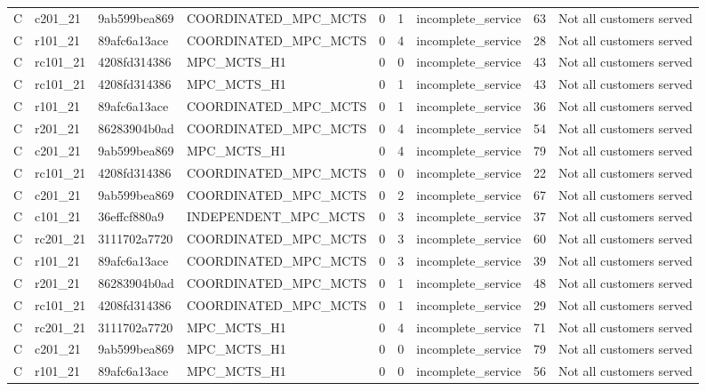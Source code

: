 \begin{table}
{\begin{tabular}{llllrrlrl}
C & c201\_21 & 9ab599bea869 & COORDINATED\_MPC\_MCTS & 0 & 1 & incomplete\_service & 63 & Not all customers served \\
C & r101\_21 & 89afc6a13ace & COORDINATED\_MPC\_MCTS & 0 & 4 & incomplete\_service & 28 & Not all customers served \\
C & rc101\_21 & 4208fd314386 & MPC\_MCTS\_H1 & 0 & 0 & incomplete\_service & 43 & Not all customers served \\
C & rc101\_21 & 4208fd314386 & MPC\_MCTS\_H1 & 0 & 1 & incomplete\_service & 43 & Not all customers served \\
C & r101\_21 & 89afc6a13ace & COORDINATED\_MPC\_MCTS & 0 & 1 & incomplete\_service & 36 & Not all customers served \\
C & r201\_21 & 86283904b0ad & COORDINATED\_MPC\_MCTS & 0 & 4 & incomplete\_service & 54 & Not all customers served \\
C & c201\_21 & 9ab599bea869 & MPC\_MCTS\_H1 & 0 & 4 & incomplete\_service & 79 & Not all customers served \\
C & rc101\_21 & 4208fd314386 & COORDINATED\_MPC\_MCTS & 0 & 0 & incomplete\_service & 22 & Not all customers served \\
C & c201\_21 & 9ab599bea869 & COORDINATED\_MPC\_MCTS & 0 & 2 & incomplete\_service & 67 & Not all customers served \\
C & c101\_21 & 36effcf880a9 & INDEPENDENT\_MPC\_MCTS & 0 & 3 & incomplete\_service & 37 & Not all customers served \\
C & rc201\_21 & 3111702a7720 & COORDINATED\_MPC\_MCTS & 0 & 3 & incomplete\_service & 60 & Not all customers served \\
C & r101\_21 & 89afc6a13ace & COORDINATED\_MPC\_MCTS & 0 & 3 & incomplete\_service & 39 & Not all customers served \\
C & r201\_21 & 86283904b0ad & COORDINATED\_MPC\_MCTS & 0 & 1 & incomplete\_service & 48 & Not all customers served \\
C & rc101\_21 & 4208fd314386 & COORDINATED\_MPC\_MCTS & 0 & 1 & incomplete\_service & 29 & Not all customers served \\
C & rc201\_21 & 3111702a7720 & MPC\_MCTS\_H1 & 0 & 4 & incomplete\_service & 71 & Not all customers served \\
C & c201\_21 & 9ab599bea869 & MPC\_MCTS\_H1 & 0 & 0 & incomplete\_service & 79 & Not all customers served \\
C & r101\_21 & 89afc6a13ace & MPC\_MCTS\_H1 & 0 & 0 & incomplete\_service & 56 & Not all customers served \\

\end{tabular}}
\end{table}
